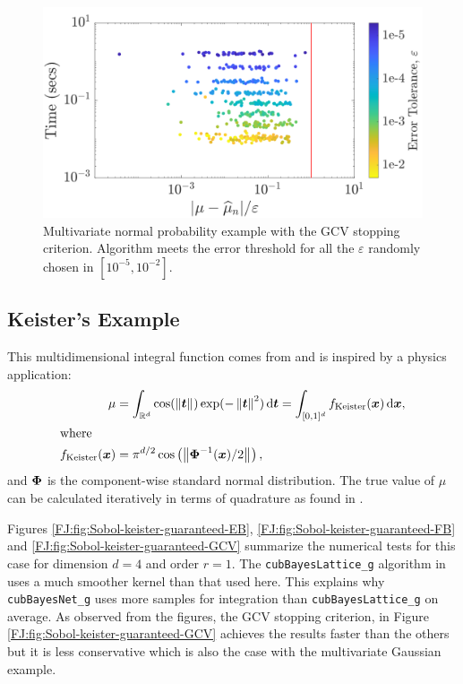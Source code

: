\documentclass[graybox,footinfo]{svmult}
\newcommand{\norm}[2][{}]{\ensuremath{\left \lVert #2 \right \rVert}_{#1}}
\newcommand{\FJHNote}[1]{{\textcolor{blue}{FJH: #1}}}
\newcommand{\JRNote}[1]{{\textcolor{green}{JR: #1}}}
\begin{document}
\begin{figure}
\centering
\includegraphics[width=0.95\linewidth]{"figures/Sobol/Sobol_MVN_guaranteed_time_GCV__d2_r1_2019-Sep-1"}
\caption[Sobol: MVN guaranteed: GCV]{Multivariate normal probability example with the GCV stopping criterion. Algorithm meets the error threshold for all the $\varepsilon$ randomly chosen in $[10^{-5}, 10^{-2}]$.}
\label{FJ:fig:Sobol-mvn-guaranteed-GCV}
\end{figure}






\subsection{Keister's Example}

This multidimensional integral function comes from \cite{Kei96} and is inspired by a physics application:
\begin{align}
\label{FJ:eqn:keister_integral}
\mu  &=  \int_{\R^d} \cos(\norm{ \bst}) \exp(-\norm{ \bst }^2) \, \textup{d}\bst 
 = \int_{[0,1]^d} f_{\textup{Keister}}(\bsx) \, \textup{d}\bsx,\\
\intertext{where }
\nonumber
f_\textup{Keister}(\bsx) &= \pi^{d/2} \cos\left(\norm{ \bsPhi^{-1}(\bsx)/2}\right)  ,
\end{align}
and ${\boldsymbol{\Phi}}$ is the component-wise standard normal distribution.
The true value of $\mu$ can be calculated iteratively in terms of  quadrature as found in \cite[Section 5.2]{RatHic19a}.


Figures \ref{FJ:fig:Sobol-keister-guaranteed-EB}, \ref{FJ:fig:Sobol-keister-guaranteed-FB} and \ref{FJ:fig:Sobol-keister-guaranteed-GCV} summarize the numerical tests for this case for dimension $d=4$ and order $r=1$.  The \texttt{cubBayesLattice\_g} algorithm in  \cite{RatHic19a} uses a much smoother kernel than that used here. This explains why \texttt{cubBayesNet\_g} uses more samples for integration than  \texttt{cubBayesLattice\_g} on average. 
As observed from the figures, the GCV stopping criterion, in Figure \ref{FJ:fig:Sobol-keister-guaranteed-GCV} achieves the results faster than the others but it is less conservative which is also the case with the multivariate Gaussian example.
\end{document}
